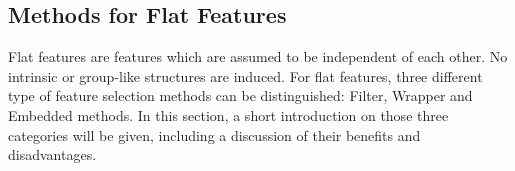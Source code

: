 \subsection{Methods for Flat Features}
\label{sec:methods.flat}


Flat features are features which are assumed to be independent of each other. No intrinsic or group-like structures are induced. 
For flat features, three different type of feature selection methods can be distinguished: Filter, Wrapper and Embedded methods.
In this section, a short introduction on those three categories will be given, including a discussion of their benefits and disadvantages.



